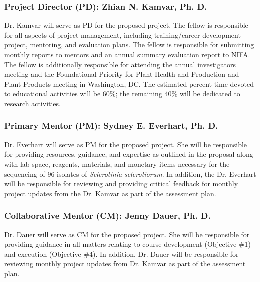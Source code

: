 \documentclass[12pt,letterpaper]{article}
\title{\ruleline{Key Personnel}}
\begin{document}
\maketitle


\subsubsection*{Project Director (PD): Zhian N. Kamvar, Ph. D.}

\noindent Dr. Kamvar will serve as PD for the proposed project. 
The fellow is responsible for all aspects of project management, including training/career development project, mentoring, and evaluation plans. 
The fellow is responsible for submitting monthly reports to mentors and an annual summary evaluation report to NIFA.
The fellow is additionally responsible for attending the annual investigators meeting and the Foundational Priority for Plant Health and Production and Plant Products meeting in Washington, DC.
The estimated percent time devoted to educational activities will be 60\%; the remaining 40\% will be dedicated to research activities. 

\subsubsection*{Primary Mentor (PM): Sydney E. Everhart, Ph. D.}

\noindent Dr. Everhart will serve as PM for the proposed project. 
She will be responsible for providing resources, guidance, and expertise as outlined in the proposal along with lab space, reagents, materials, and monetary items necessary for the sequencing of 96 isolates of \textit{Sclerotinia sclerotiorum}. 
In addition, the Dr. Everhart will be responsible for reviewing and providing critical feedback for monthly project updates from the Dr. Kamvar as part of the assessment plan. 

\subsubsection*{Collaborative Mentor (CM): Jenny Dauer, Ph. D.}

\noindent Dr. Dauer will serve as CM for the proposed project.
She will be responsible for providing guidance in all matters relating to course development (Objective \#1) and execution (Objective \#4). 
In addition, Dr. Dauer will be responsible for reviewing monthly project updates from Dr. Kamvar as part of the assessment plan.
\end{document}
